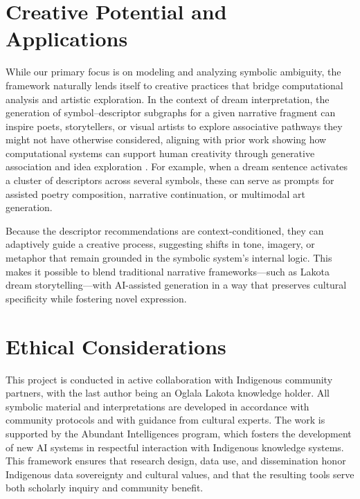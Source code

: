 \documentclass[final,creativeai]{article}
\begin{document}
\section{Creative Potential and Applications}
While our primary focus is on modeling and analyzing symbolic ambiguity, the framework naturally lends itself to creative practices that bridge computational analysis and artistic exploration. In the context of dream interpretation, the generation of symbol–descriptor subgraphs for a given narrative fragment can inspire poets, storytellers, or visual artists to explore associative pathways they might not have otherwise considered, aligning with prior work showing how computational systems can support human creativity through generative association and idea exploration \citep{varshney_associative_2016, gross_lexical_2012, rick_supermind_2023}. For example, when a dream sentence activates a cluster of descriptors across several symbols, these can serve as prompts for assisted poetry composition, narrative continuation, or multimodal art generation.

Because the descriptor recommendations are context-conditioned, they can adaptively guide a creative process, suggesting shifts in tone, imagery, or metaphor that remain grounded in the symbolic system's internal logic. This makes it possible to blend traditional narrative frameworks—such as Lakota dream storytelling—with AI-assisted generation in a way that preserves cultural specificity while fostering novel expression.

\section{Ethical Considerations}
This project is conducted in active collaboration with Indigenous community partners, with the last author being an Oglala Lakota knowledge holder. All symbolic material and interpretations are developed in accordance with community protocols and with guidance from cultural experts. The work is supported by the Abundant Intelligences program, which fosters the development of new AI systems in respectful interaction with Indigenous knowledge systems. This framework ensures that research design, data use, and dissemination honor Indigenous data sovereignty and cultural values, and that the resulting tools serve both scholarly inquiry and community benefit.


\end{document}
